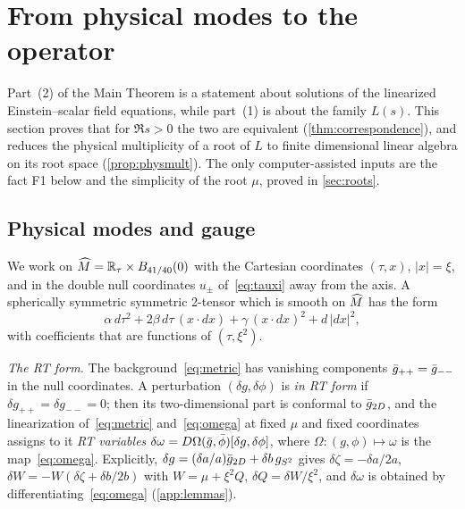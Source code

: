 \section{From physical modes to the operator}\label{sec:physical}

Part~(2) of the Main Theorem is a statement about solutions of the linearized Einstein--scalar field
equations, while part~(1) is about the family $L(s)$. This section proves that for $\Re s>0$ the two are
equivalent (\cref{thm:correspondence}), and reduces the physical multiplicity of a root of $L$ to finite
dimensional linear algebra on its root space (\cref{prop:physmult}). The only computer-assisted inputs are
the fact F1 below and the simplicity of the root $\mu$, proved in \cref{sec:roots}.

\subsection{Physical modes and gauge}\label{sec:physical-defs}

We work on $\widehat M=\mathbb{R}_\tau\times B_{41/40}(0)$ with the Cartesian coordinates $(\tau,x)$, $|x|=\xi$, and in
the double null coordinates $u_\pm$ of~\eqref{eq:tauxi} away from the axis. A spherically symmetric
symmetric 2-tensor which is smooth on $\widehat M$ has the form
\begin{equation}\label{eq:invariant-tensor}
  \alpha\,d\tau^2+2\beta\,d\tau\,(x\cdot dx)+\gamma\,(x\cdot dx)^2+d\,|dx|^2,
\end{equation}
with coefficients that are functions of $(\tau,\xi^2)$.

\emph{The RT form.} The background~\eqref{eq:metric} has vanishing components $\bar g_{++}=\bar g_{--}$ in
the null coordinates. A perturbation $(\delta g,\delta\phi)$ is \emph{in RT form} if
$\delta g_{++}=\delta g_{--}=0$; then its two-dimensional part is conformal to $\bar g_{2D}$, and the
linearization of~\eqref{eq:metric} and~\eqref{eq:omega} at fixed $\mu$ and fixed coordinates assigns to it
\emph{RT variables} $\delta\omega=D\Omega(\bar g,\bar\phi)[\delta g,\delta\phi]$, where
$\Omega:(g,\phi)\mapsto\omega$ is the map~\eqref{eq:omega}. Explicitly, $\delta g=(\delta a/a)\bar g_{2D}+\delta
b\,g_{S^2}$ gives $\delta\zeta=-\delta a/2a$, $\delta W=-W(\delta\zeta+\delta b/2b)$ with $W=\mu+\xi^2Q$,
$\delta Q=\delta W/\xi^2$, and $\delta\omega$ is obtained by differentiating~\eqref{eq:omega}
(\cref{app:lemmas}).

